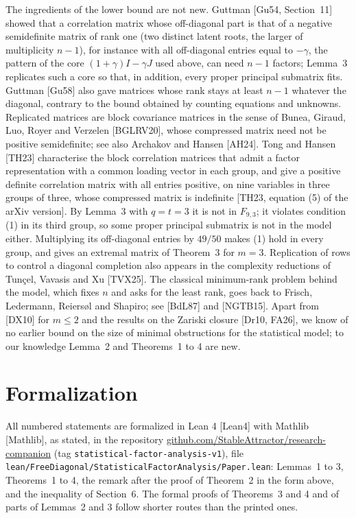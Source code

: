 \documentclass[11pt,letterpaper,reqno]{amsart}
\theoremstyle{spaced}
\begin{document}
The ingredients of the lower bound are not new. Guttman {[}Gu54, Section~11{]} showed that a correlation matrix whose off-diagonal part is that of a negative semidefinite matrix of rank one (two distinct latent roots, the larger of multiplicity \(n-1\)), for instance with all off-diagonal entries equal to \(-\gamma\), the pattern of the core \((1+\gamma)I - \gamma J\) used above, can need \(n-1\) factors; Lemma~3 replicates such a core so that, in addition, every proper principal submatrix fits. Guttman {[}Gu58{]} also gave matrices whose rank stays at least \(n-1\) whatever the diagonal, contrary to the bound obtained by counting equations and unknowns. Replicated matrices are block covariance matrices in the sense of Bunea, Giraud, Luo, Royer and Verzelen {[}BGLRV20{]}, whose compressed matrix need not be positive semidefinite; see also Archakov and Hansen {[}AH24{]}. Tong and Hansen {[}TH23{]} characterise the block correlation matrices that admit a factor representation with a common loading vector in each group, and give a positive definite correlation matrix with all entries positive, on nine variables in three groups of three, whose compressed matrix is indefinite {[}TH23, equation (5) of the arXiv version{]}. By Lemma~3 with \(q = t = 3\) it is not in \(F_{9,3}\); it violates condition (1) in its third group, so some proper principal submatrix is not in the model either. Multiplying its off-diagonal entries by \(49/50\) makes (1) hold in every group, and gives an extremal matrix of Theorem~3 for \(m = 3\). Replication of rows to control a diagonal completion also appears in the complexity reductions of Tunçel, Vavasis and Xu {[}TVX25{]}. The classical minimum-rank problem behind the model, which fixes \(n\) and asks for the least rank, goes back to Frisch, Ledermann, Reiersøl and Shapiro; see {[}BdL87{]} and {[}NGTB15{]}. Apart from {[}DX10{]} for \(m \le 2\) and the results on the Zariski closure {[}Dr10, FA26{]}, we know of no earlier bound on the size of minimal obstructions for the statistical model; to our knowledge Lemma~2 and Theorems~1 to 4 are new.

\hypertarget{formalization}{%
\section{Formalization}\label{formalization}}

All numbered statements are formalized in Lean 4 {[}Lean4{]} with Mathlib {[}Mathlib{]}, as stated, in the repository \href{https://github.com/StableAttractor/research-companion/tree/statistical-factor-analysis-v1}{github.com/\allowbreak{}StableAttractor/\allowbreak{}\mbox{research-companion}} (tag \texttt{statistical-factor-analysis-v1}), file \texttt{lean/\allowbreak{}FreeDiagonal/\allowbreak{}StatisticalFactorAnalysis/\allowbreak{}Paper.lean}: Lemmas~1 to 3, Theorems~1 to 4, the remark after the proof of Theorem~2 in the form above, and the inequality of Section~6. The formal proofs of Theorems~3 and 4 and of parts of Lemmas~2 and 3 follow shorter routes than the printed ones.
\end{document}

